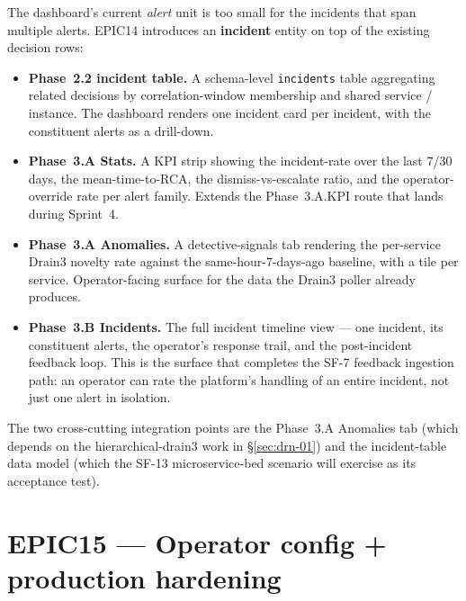\documentclass[11pt,a4paper,oneside]{report}
\begin{document}
The dashboard's current \emph{alert} unit is too small for the
incidents that span multiple alerts.  EPIC14 introduces an
\textbf{incident} entity on top of the existing decision rows:

\begin{itemize}
  \item \textbf{Phase~2.2 incident table.}  A schema-level
        \texttt{incidents} table aggregating related decisions
        by correlation-window membership and shared service /
        instance.  The dashboard renders one incident card per
        incident, with the constituent alerts as a drill-down.
  \item \textbf{Phase~3.A Stats.}  A KPI strip showing the
        incident-rate over the last 7/30 days, the
        mean-time-to-RCA, the dismiss-vs-escalate ratio, and the
        operator-override rate per alert family.  Extends the
        Phase~3.A.KPI route that lands during Sprint~4.
  \item \textbf{Phase~3.A Anomalies.}  A detective-signals tab
        rendering the per-service Drain3 novelty rate against
        the same-hour-7-days-ago baseline, with a tile per
        service.  Operator-facing surface for the data the
        Drain3 poller already produces.
  \item \textbf{Phase~3.B Incidents.}  The full incident
        timeline view --- one incident, its constituent alerts,
        the operator's response trail, and the post-incident
        feedback loop.  This is the surface that completes the
        SF-7 feedback ingestion path: an operator can rate the
        platform's handling of an entire incident, not just one
        alert in isolation.
\end{itemize}

The two cross-cutting integration points are the Phase~3.A
Anomalies tab (which depends on the hierarchical-drain3 work in
\S\ref{sec:drn-01}) and the incident-table data model (which
the SF-13 microservice-bed scenario will exercise as its
acceptance test).

\section{EPIC15 --- Operator config + production hardening}
\end{document}
